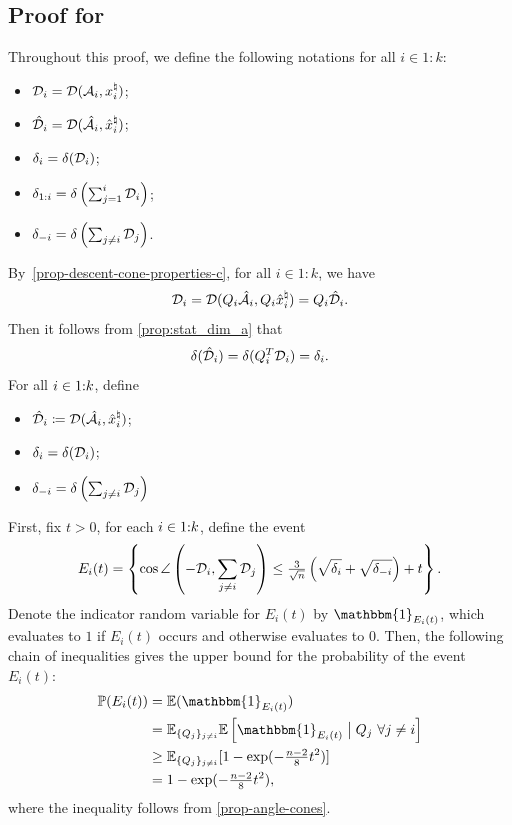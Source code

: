 \subsection{Proof for } \label{sec:proof-thm:Incoherence}

Throughout this proof, we define the following notations for all $i\in1:k$:
\begin{itemize} 
  \item $\mathcal{D}_i = \mathcal{D}(\mathcal{A}_i, x_i^{\natural})$;
  \item $\hat {\mathcal{D}}_i =  \mathcal{D}(\hat {\mathcal{A}}_i, \hat x_i^{\natural})$;
  \item $\delta_i = \delta(\mathcal{D}_i)$;
  \item $\delta_{1:i} = \delta\left(\sum_{j=1}^i\mathcal{D}_i\right)$;
  \item $\delta_{-i} = \delta\left(\sum_{j\neq i}\mathcal{D}_j\right)$.
\end{itemize} 
By~\autoref{prop-descent-cone-properties-c}, for all $i\in1:k$, we have
\[\mathcal{D}_i = \mathcal{D}(Q_i \hat {\mathcal{A}}_i, Q_i \hat x_i^{\natural}) = Q_i\hat{\mathcal{D}}_i.\]
Then it follows from \autoref{prop:stat_dim_a} that
\[\delta(\hat {\mathcal{D}}_i) = \delta(Q_i^T \mathcal{D}_i) = \delta_i.\]
For all $i\in1\mathord{:}k$, define 
\begin{itemize}
  \item $\hat {\mathcal{D}}_i\coloneqq  \mathcal{D}(\hat {\mathcal{A}}_i, \hat x_i^{\natural})$;
  \item $\delta_i = \delta(\mathcal{D}_i)$;
  \item $\delta_{-i} = \delta\left(\sum_{j\neq i}\mathcal{D}_j\right)$
\end{itemize}
First, fix $t >0$, for each $i\in1\mathord{:}k$, define the event
\[
E_i(t) =  \left \{ \cos\angle\left(-\mathcal{D}_i, \sum_{j \neq i}\mathcal{D}_j\right) \leq \tfrac{3}{\sqrt{n}}\left(\sqrt{\delta_i} + \sqrt{\delta_{-i}}\right) + t \right\}.
\] 
Denote the indicator random variable for $E_i(t)$ by $\mathbbm{1}_{E_i(t)}$, which evaluates to $1$ if $E_i(t)$ occurs and otherwise evaluates to $0$. Then, the following chain of inequalities gives the upper bound for the probability of the event $E_i(t)$:
\begin{align} \label{eq:123}
  \begin{split}
\mP (E_i(t)) 
  &= \mE (\mathbbm{1}_{E_i(t)})
\\&= \mE_{\{Q_j\}_{j\ne i}} \mE\left[\mathbbm{1}_{E_i(t)} \bigm\vert Q_j\ \forall j\ne i \right]
\\&\geq \mE_{\{Q_j\}_{j\ne i}} [ 1 - \exp(-\tfrac{n-2}{8}t^2) ]
\\&= 1 - \exp(-\tfrac{n-2}{8}t^2),
\end{split}
\end{align}
where the inequality follows from \autoref{prop-angle-cones}. 

